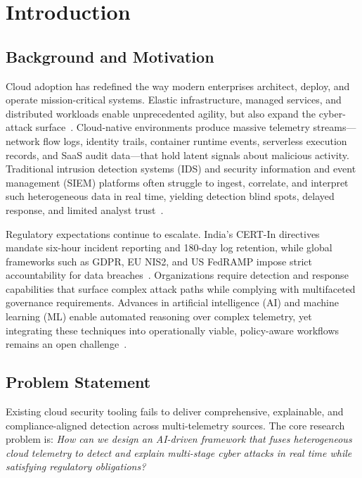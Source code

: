 \chapter{Introduction}\label{chap:intro}
\section{Background and Motivation}
Cloud adoption has redefined the way modern enterprises architect, deploy, and operate mission-critical systems. Elastic infrastructure, managed services, and distributed workloads enable unprecedented agility, but also expand the cyber-attack surface~\cite{hashizume2013analysis}. Cloud-native environments produce massive telemetry streams---network flow logs, identity trails, container runtime events, serverless execution records, and SaaS audit data---that hold latent signals about malicious activity. Traditional intrusion detection systems (IDS) and security information and event management (SIEM) platforms often struggle to ingest, correlate, and interpret such heterogeneous data in real time, yielding detection blind spots, delayed response, and limited analyst trust~\cite{chandola2009anomaly,wu2021gnnreview}.

Regulatory expectations continue to escalate. India's CERT-In directives mandate six-hour incident reporting and 180-day log retention, while global frameworks such as GDPR, EU NIS2, and US FedRAMP impose strict accountability for data breaches~\cite{certin2022directive,gdpr2016,nis22022,fedramp2023}. Organizations require detection and response capabilities that surface complex attack paths while complying with multifaceted governance requirements. Advances in artificial intelligence (AI) and machine learning (ML) enable automated reasoning over complex telemetry, yet integrating these techniques into operationally viable, policy-aware workflows remains an open challenge~\cite{nist800207,lundberg2017shap}.

\section{Problem Statement}
Existing cloud security tooling fails to deliver comprehensive, explainable, and compliance-aligned detection across multi-telemetry sources. The core research problem is: \emph{How can we design an AI-driven framework that fuses heterogeneous cloud telemetry to detect and explain multi-stage cyber attacks in real time while satisfying regulatory obligations?}

